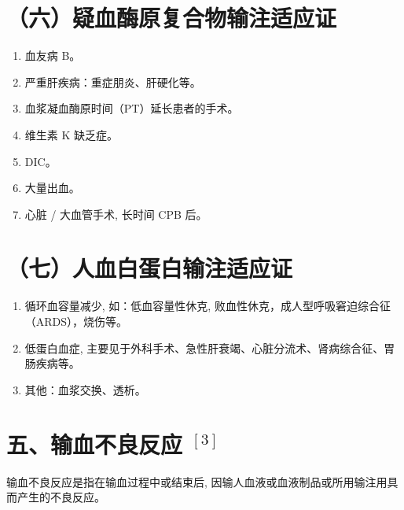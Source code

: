 \documentclass[10pt]{article}
\begin{document}
\section*{（六）疑血酶原复合物输注适应证}
\begin{enumerate}
  \item 血友病 B。

  \item 严重肝疾病：重症朋炎、肝硬化等。

  \item 血浆凝血酶原时间（PT）延长患者的手术。

  \item 维生素 $\mathrm{K}$ 缺乏症。

  \item DIC。

  \item 大量出血。

  \item 心脏 / 大血管手术, 长时间 CPB 后。

\end{enumerate}

\section*{（七）人血白蛋白输注适应证}
\begin{enumerate}
  \item 循环血容量减少, 如：低血容量性休克, 败血性休克，成人型呼吸窘迫综合征（ARDS），烧伤等。

  \item 低蛋白血症, 主要见于外科手术、急性肝衰竭、心脏分流术、肾病综合征、胃肠疾病等。

  \item 其他：血浆交换、透析。

\end{enumerate}

\section*{五、输血不良反应 ${ }^{[3]}$}
输血不良反应是指在输血过程中或结束后, 因输人血液或血液制品或所用输注用具而产生的不良反应。
\end{document}
